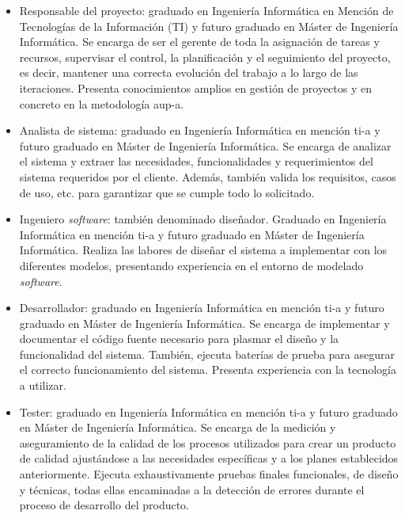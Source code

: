 \documentclass[12pt,a4paper, twoside]{report}
\begin{document}
	\begin{itemize}
		\item Responsable del proyecto: graduado en Ingeniería Informática en Mención de Tecnologías de la Información (TI) y futuro graduado en Máster de Ingeniería Informática. Se encarga de ser el gerente de toda la asignación de tareas y recursos, supervisar el control, la planificación y el seguimiento del proyecto, es decir, mantener una correcta evolución del trabajo a lo largo de las iteraciones. Presenta conocimientos amplios en gestión de proyectos y en concreto en la metodología \gls{aup-a}.
		
		\item Analista de sistema: graduado en Ingeniería Informática en mención \gls{ti-a} y futuro graduado en Máster de Ingeniería Informática. Se encarga de analizar el sistema y extraer las necesidades, funcionalidades y requerimientos del sistema requeridos por el cliente. Además, también valida los requisitos, casos de uso, etc. para garantizar que se cumple todo lo solicitado.
		
		\item Ingeniero \textit{software}: también denominado diseñador. Graduado en Ingeniería Informática en mención \gls{ti-a} y futuro graduado en Máster de Ingeniería Informática. Realiza las labores de diseñar el sistema a implementar con los diferentes modelos, presentando experiencia en el entorno de modelado \textit{software}.
		
		\item Desarrollador: graduado en Ingeniería Informática en mención \gls{ti-a} y futuro graduado en Máster de Ingeniería Informática. Se encarga de implementar y documentar el código fuente necesario para plasmar el diseño y la funcionalidad del sistema. También, ejecuta baterías de prueba para asegurar el correcto funcionamiento del sistema. Presenta experiencia con la tecnología a utilizar.
		
		\item Tester: graduado en Ingeniería Informática en mención \gls{ti-a} y futuro graduado en Máster de Ingeniería Informática. Se encarga de la medición y aseguramiento de la calidad de los procesos utilizados para crear un producto de calidad ajustándose a las necesidades específicas y a los planes establecidos anteriormente. Ejecuta exhaustivamente pruebas finales funcionales, de diseño y técnicas, todas ellas encaminadas a la detección de errores durante el proceso de desarrollo del producto.		
	\end{itemize}
		
\end{document}

